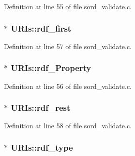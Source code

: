 Definition at line 55 of file sord\+\_\+validate.\+c.

\subsubsection[{\texorpdfstring{rdf\+\_\+first}{rdf_first}}]{$\ast$ U\+R\+Is\+::rdf\+\_\+first}\hypertarget{struct_u_r_is_a564f0485e5229e2220e1189e66bf8c2a}{}\label{struct_u_r_is_a564f0485e5229e2220e1189e66bf8c2a}


Definition at line 57 of file sord\+\_\+validate.\+c.

\subsubsection[{\texorpdfstring{rdf\+\_\+\+Property}{rdf_Property}}]{$\ast$ U\+R\+Is\+::rdf\+\_\+\+Property}\hypertarget{struct_u_r_is_ae4682501bc0228f9c0372f05bfb868b2}{}\label{struct_u_r_is_ae4682501bc0228f9c0372f05bfb868b2}


Definition at line 56 of file sord\+\_\+validate.\+c.

\subsubsection[{\texorpdfstring{rdf\+\_\+rest}{rdf_rest}}]{$\ast$ U\+R\+Is\+::rdf\+\_\+rest}\hypertarget{struct_u_r_is_a30d9760def8a047ec73f4299e339fdeb}{}\label{struct_u_r_is_a30d9760def8a047ec73f4299e339fdeb}


Definition at line 58 of file sord\+\_\+validate.\+c.

\subsubsection[{\texorpdfstring{rdf\+\_\+type}{rdf_type}}]{$\ast$ U\+R\+Is\+::rdf\+\_\+type}\hypertarget{struct_u_r_is_a77d3b8be0307e4bb9937e57c4df03eb3}{}\label{struct_u_r_is_a77d3b8be0307e4bb9937e57c4df03eb3}


